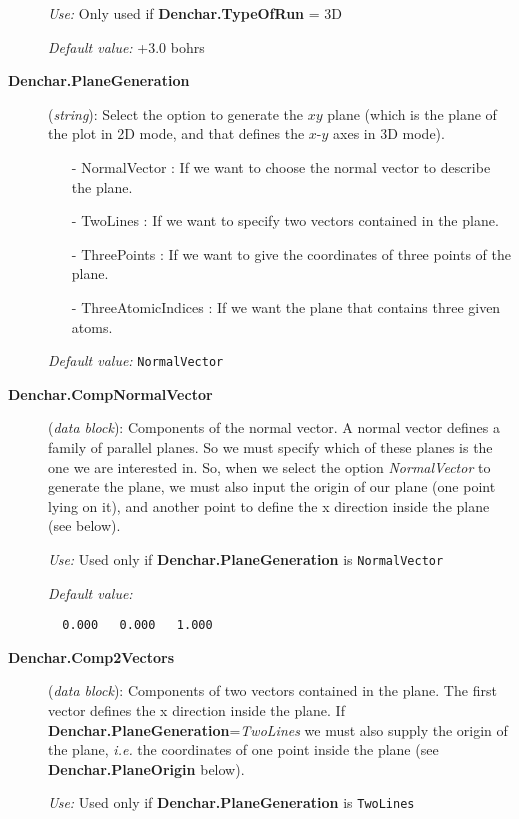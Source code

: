 \begin{description}
{\it Use:} Only used if {\bf Denchar.TypeOfRun} = 3D

{\it Default value:} +3.0 bohrs


\item[{\bf Denchar.PlaneGeneration}] ({\it string}): 
 Select the option to generate the $xy$ plane (which is
 the plane of the plot in 2D mode, and that defines the $x$-$y$
 axes in 3D mode).
 

\begin{itemize}
\item[-] NormalVector : If we want to choose the normal vector to describe the
                        plane.
\item[-] TwoLines       : If we want to specify two vectors contained in the 
                        plane.
\item[-] ThreePoints  : If we want to give the coordinates of three points 
                        of the plane.
\item[-] ThreeAtomicIndices : If we want the plane that contains three 
                        given atoms.
\end{itemize}
\noindent
{\it Default value:} {\tt NormalVector}


\item[{\bf Denchar.CompNormalVector}] ({\it data block}): 
Components of the normal vector. A normal vector defines a family of parallel
planes. So we must specify which of these planes is the one 
 we are interested in.
So, when we select the option {\it NormalVector} to generate the plane, we must 
also input the origin of our plane (one point lying on it), and another
point to define the x direction inside the plane (see below).

{\it Use:} Used only if {\bf Denchar.PlaneGeneration} is {\tt NormalVector}
    
{\it Default value:} 
\begin{verbatim}
  0.000   0.000   1.000
\end{verbatim}

\item[{\bf Denchar.Comp2Vectors}] ({\it data block}): 
Components of two vectors contained in the plane. 
The first vector defines the x direction inside the plane.
If {\bf Denchar.PlaneGeneration}={\it TwoLines} we must also supply the origin 
of the plane, {\it i.e.}  the coordinates of one point inside the plane (see
{\bf Denchar.PlaneOrigin} below). 

{\it Use:} Used only if {\bf Denchar.PlaneGeneration} is {\tt TwoLines}
    

\end{description}
